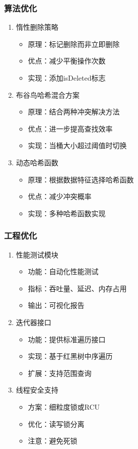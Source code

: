\documentclass[12pt,a4paper]{article}
\begin{document}
\subsubsection{算法优化}
\begin{enumerate}
\item 惰性删除策略
\begin{itemize}
\item 原理：标记删除而非立即删除
\item 优点：减少平衡操作次数
\item 实现：添加isDeleted标志
\end{itemize}

\item 布谷鸟哈希混合方案
\begin{itemize}
\item 原理：结合两种冲突解决方法
\item 优点：进一步提高查找效率
\item 实现：当桶大小超过阈值时切换
\end{itemize}

\item 动态哈希函数
\begin{itemize}
\item 原理：根据数据特征选择哈希函数
\item 优点：减少冲突概率
\item 实现：多种哈希函数实现
\end{itemize}
\end{enumerate}

\subsubsection{工程优化}
\begin{enumerate}
\item 性能测试模块
\begin{itemize}
\item 功能：自动化性能测试
\item 指标：吞吐量、延迟、内存占用
\item 输出：可视化报告
\end{itemize}

\item 迭代器接口
\begin{itemize}
\item 功能：提供标准遍历接口
\item 实现：基于红黑树中序遍历
\item 扩展：支持范围查询
\end{itemize}

\item 线程安全支持
\begin{itemize}
\item 方案：细粒度锁或RCU
\item 优化：读写锁分离
\item 注意：避免死锁
\end{itemize}
\end{enumerate}
\end{document}

